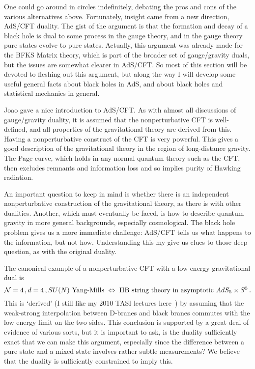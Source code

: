 \documentclass[12pt]{article}
\newcommand{\be}{\begin{equation}}
\newcommand{\ee}{\end{equation}}
\begin{document}
One could go around in circles indefinitely, debating the pros and cons of the various alternatives above.  Fortunately, insight came from a new direction, AdS/CFT duality.  The gist of the argument is that the formation and decay of a black hole is dual to some process in the gauge theory, and in the gauge theory pure states evolve to pure states.  Actually, this argument was already made for the BFKS Matrix theory, which is  part of the broader set of gauge/gravity duals, but the issues are somewhat clearer in AdS/CFT.
So most of this section will be devoted to fleshing out this argument, but along the way I will develop some useful general facts about black holes in AdS, and about black holes and statistical mechanics in general.


Joao gave a nice introduction to {\rm AdS/CFT}.  As with almost all discussions of gauge/gravity duality, it is assumed that the nonperturbative CFT is well-defined, and all properties of the gravitational theory are derived from this.  Having a nonperturbative construct of the CFT is very powerful.  This gives a good description of the gravitational theory in the region of long-distance gravity.  The Page curve, which holds in any normal quantum theory such as the CFT, then excludes remnants and information loss and so implies purity of Hawking radiation.  

An important question to keep in mind is whether there is an independent nonperturbative construction of the gravitational theory, as there is with other dualities.  Another, which must eventually be faced, is how to describe quantum gravity in more general backgrounds, especially cosmological.  The black hole problem gives us a more immediate challenge: AdS/CFT tells us what happens to the information, but not how.
Understanding this my give us clues to those deep question, as with the original duality.



The canonical example of a nonperturbative CFT with a low energy gravitational dual is
\be
{\cal N} = 4\,, d=4\,, \mbox{$SU(N)$ Yang-Mills}\ \Leftrightarrow\ \mbox{IIB string theory in asymptotic $AdS_5 \times S^5$} \,. \label{adscft}
\ee
This is `derived' (I still like my 2010 TASI lectures here~\cite{Polchinski:2010hw}) by assuming that the weak-strong interpolation between D-branes and black branes commutes with the low energy limit on the two sides.  This conclusion is supported by a great deal of evidence of various sorts, but it is important to ask, is the duality sufficiently exact that we can make this argument, especially since the difference between a pure state and a mixed state involves rather subtle measurements?  We believe that the duality is sufficiently constrained to imply this.
\end{document}
